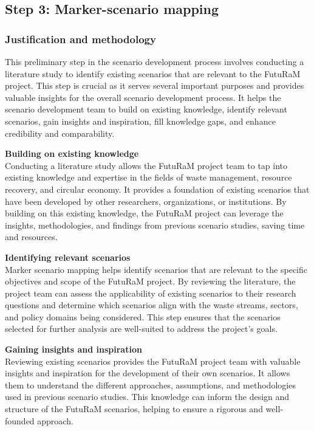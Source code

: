 \subsection{Step 3: Marker-scenario mapping}

\subsubsection{Justification and methodology}
This preliminary step in the scenario development process involves conducting a literature study to identify existing scenarios that are relevant to the FutuRaM project. This step is crucial as it serves several important purposes and provides valuable insights for the overall scenario development process. It helps the scenario development team to build on existing knowledge, identify relevant scenarios, gain insights and inspiration, fill knowledge gaps, and enhance credibility and comparability.



\textbf{Building on existing knowledge}\\
Conducting a literature study allows the FutuRaM project team to tap into existing knowledge and expertise in the fields of waste management, resource recovery, and circular economy. It provides a foundation of existing scenarios that have been developed by other researchers, organizations, or institutions. By building on this existing knowledge, the FutuRaM project can leverage the insights, methodologies, and findings from previous scenario studies, saving time and resources.



\textbf{Identifying relevant scenarios}\\
Marker scenario mapping helps identify scenarios that are relevant to the specific objectives and scope of the FutuRaM project. By reviewing the literature, the project team can assess the applicability of existing scenarios to their research questions and determine which scenarios align with the waste streams, sectors, and policy domains being considered. This step ensures that the scenarios selected for further analysis are well-suited to address the project's goals.



\textbf{Gaining insights and inspiration}\\
Reviewing existing scenarios provides the FutuRaM project team with valuable insights and inspiration for the development of their own scenarios. It allows them to understand the different approaches, assumptions, and methodologies used in previous scenario studies. This knowledge can inform the design and structure of the FutuRaM scenarios, helping to ensure a rigorous and well-founded approach.



